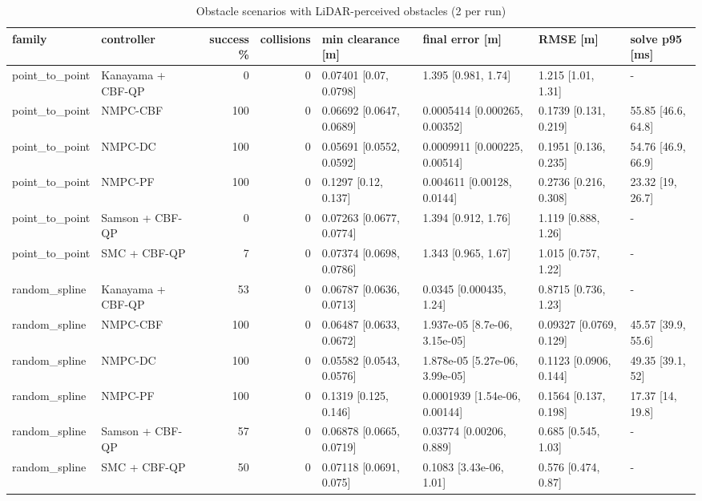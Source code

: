 \begin{table}
\caption{Obstacle scenarios with LiDAR-perceived obstacles (2 per run)}
\label{tab:obstacles_summary}
\begin{tabular}{llrrllll}
\toprule
family & controller & success \% & collisions & min clearance [m] & final error [m] & RMSE [m] & solve p95 [ms] \\
\midrule
point\_to\_point & Kanayama + CBF-QP & 0 & 0 & 0.07401 [0.07, 0.0798] & 1.395 [0.981, 1.74] & 1.215 [1.01, 1.31] & - \\
point\_to\_point & NMPC-CBF & 100 & 0 & 0.06692 [0.0647, 0.0689] & 0.0005414 [0.000265, 0.00352] & 0.1739 [0.131, 0.219] & 55.85 [46.6, 64.8] \\
point\_to\_point & NMPC-DC & 100 & 0 & 0.05691 [0.0552, 0.0592] & 0.0009911 [0.000225, 0.00514] & 0.1951 [0.136, 0.235] & 54.76 [46.9, 66.9] \\
point\_to\_point & NMPC-PF & 100 & 0 & 0.1297 [0.12, 0.137] & 0.004611 [0.00128, 0.0144] & 0.2736 [0.216, 0.308] & 23.32 [19, 26.7] \\
point\_to\_point & Samson + CBF-QP & 0 & 0 & 0.07263 [0.0677, 0.0774] & 1.394 [0.912, 1.76] & 1.119 [0.888, 1.26] & - \\
point\_to\_point & SMC + CBF-QP & 7 & 0 & 0.07374 [0.0698, 0.0786] & 1.343 [0.965, 1.67] & 1.015 [0.757, 1.22] & - \\
random\_spline & Kanayama + CBF-QP & 53 & 0 & 0.06787 [0.0636, 0.0713] & 0.0345 [0.000435, 1.24] & 0.8715 [0.736, 1.23] & - \\
random\_spline & NMPC-CBF & 100 & 0 & 0.06487 [0.0633, 0.0672] & 1.937e-05 [8.7e-06, 3.15e-05] & 0.09327 [0.0769, 0.129] & 45.57 [39.9, 55.6] \\
random\_spline & NMPC-DC & 100 & 0 & 0.05582 [0.0543, 0.0576] & 1.878e-05 [5.27e-06, 3.99e-05] & 0.1123 [0.0906, 0.144] & 49.35 [39.1, 52] \\
random\_spline & NMPC-PF & 100 & 0 & 0.1319 [0.125, 0.146] & 0.0001939 [1.54e-06, 0.00144] & 0.1564 [0.137, 0.198] & 17.37 [14, 19.8] \\
random\_spline & Samson + CBF-QP & 57 & 0 & 0.06878 [0.0665, 0.0719] & 0.03774 [0.00206, 0.889] & 0.685 [0.545, 1.03] & - \\
random\_spline & SMC + CBF-QP & 50 & 0 & 0.07118 [0.0691, 0.075] & 0.1083 [3.43e-06, 1.01] & 0.576 [0.474, 0.87] & - \\
\bottomrule
\end{tabular}
\end{table}
